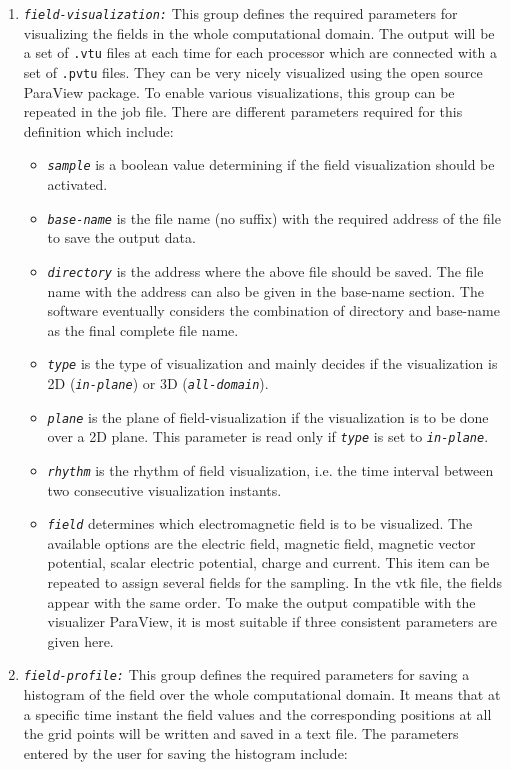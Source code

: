 \begin{enumerate}
\item {\tt \small \em field-visualization:} This group defines the required parameters for visualizing the fields in the whole computational domain. The output will be a set of \texttt{.vtu} files at each time for each processor which are connected with a set of \texttt{.pvtu} files. They can be very nicely visualized using the open source ParaView package. To enable various visualizations, this group can be repeated in the job file. There are different parameters required for this definition which include:
%
\begin{itemize}
	\item {\tt \small \em sample} is a boolean value determining if the field visualization should be activated.
	\item {\tt \small \em base-name} is the file name (no suffix) with the required address of the file to save the output data.
	\item {\tt \small \em directory} is the address where the above file should be saved. The file name with the address can also be given in the base-name section. The software eventually considers the combination of directory and base-name as the final complete file name.
	\item {\tt \small \em type} is the type of visualization and mainly decides if the visualization is 2D ({\tt \small \em in-plane}) or 3D ({\tt \small \em all-domain}).
	\item {\tt \small \em plane} is the plane of field-visualization if the visualization is to be done over a 2D plane. This parameter is read only if {\tt \small \em type} is set to {\tt \small \em in-plane}.
	\item {\tt \small \em rhythm} is the rhythm of field visualization, i.e. the time interval between two consecutive visualization instants.
	\item {\tt \small \em field} determines which electromagnetic field is to be visualized. The available options are the electric field, magnetic field, magnetic vector potential, scalar electric potential, charge and current. This item can be repeated to assign several fields for the sampling. In the vtk file, the fields appear with the same order. To make the output compatible with the visualizer ParaView, it is most suitable if three consistent parameters are given here.
\end{itemize}
\item {\tt \small \em field-profile:} This group defines the required parameters for saving a histogram of the field over the whole computational domain. It means that at a specific time instant the field values and the corresponding positions at all the grid points will be written and saved in a text file. The parameters entered by the user for saving the histogram include:

\end{enumerate}
